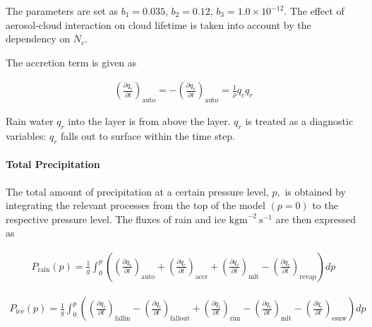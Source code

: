 The parameters are set as \(b_1 = 0.035\), \(b_2 =0.12\), \(b_3 = 1.0\times10^{-12}\). The effect of aerosol-cloud interaction on cloud lifetime is taken into account by the dependency on \(N_c\).

The accretion term is given as

\begin{eqnarray}
\left(\frac{\partial q_r}{\partial t}\right)_{\text {auto}}
=-\left(\frac{\partial q_c}{\partial t}\right)_{\text {auto}}
=\frac{1}{\rho}q_c q_r
\end{eqnarray}

Rain water \(q_r\) into the layer is from above the layer. \(q_r\) is treated as a diagnostic variables: \(q_r\) falls out to surface within the time step.

\hypertarget{total-precipitation}{%
\paragraph{Total Precipitation}\label{total-precipitation}}

The total amount of precipitation at a certain pressure level, \(p,\) is obtained by integrating the relevant processes from the top of the model \((p=0)\) to the respective pressure level. The fluxes
of rain and ice \(\mathrm{kgm}^{-2} \mathrm{~s}^{-1}\) are then expressed as

\begin{eqnarray}
P_{\text {rain}}(p) =\frac{1}{g} \int_{0}^{p}\left(
\left(\frac{\partial q_r}{\partial t}\right)_{\text {auto}}
+\left(\frac{\partial q_r}{\partial t}\right)_{\text {accr}}
+\left(\frac{\partial q_r}{\partial t}\right)_{\text {mlt}}
-\left(\frac{\partial q_r}{\partial t}\right)_{\text {revap}}
\right) d p
\end{eqnarray}

\begin{eqnarray}
P_{\text {ice}}(p)
=\frac{1}{g} \int_{0}^{p}\left(
\left(\frac{\partial q_i}{\partial t}\right)_{\text {fallin}}
-\left(\frac{\partial q_i}{\partial t}\right)_{\text {fallout}}
+\left(\frac{\partial q_i}{\partial t}\right)_{\text {rim}}
-\left(\frac{\partial q_r}{\partial t}\right)_{\text {mlt}}
-\left(\frac{\partial q_r}{\partial t}\right)_{\text {esnw}}
\right) d p
\end{eqnarray}
